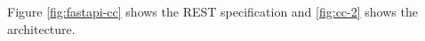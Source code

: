 Figure \ref{fig:fastapi-cc} shows the REST specification and \ref{fig:cc-2} shows the architecture. 



